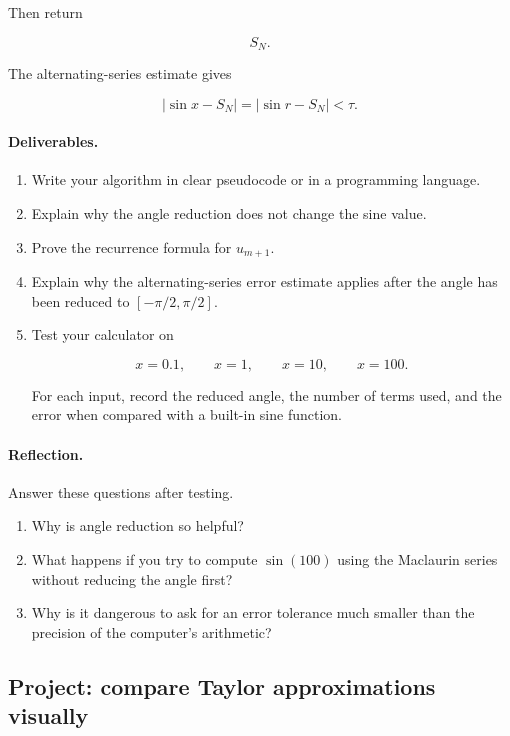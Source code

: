 Then return

\[
S_N.
\]

The alternating-series estimate gives

\[
|\sin x-S_N|=|\sin r-S_N|<\tau.
\]

\paragraph{Deliverables.}
\begin{enumerate}
\item Write your algorithm in clear pseudocode or in a programming language.

\item Explain why the angle reduction does not change the sine value.

\item Prove the recurrence formula for \(u_{m+1}\).

\item Explain why the alternating-series error estimate applies after the angle has been
reduced to \([-\pi/2,\pi/2]\).

\item Test your calculator on

\[
x=0.1,\qquad x=1,\qquad x=10,\qquad x=100.
\]

For each input, record the reduced angle, the number of terms used, and the error when
compared with a built-in sine function.
\end{enumerate}

\paragraph{Reflection.}
Answer these questions after testing.

\begin{enumerate}
\item Why is angle reduction so helpful?

\item What happens if you try to compute \(\sin(100)\) using the Maclaurin series without
reducing the angle first?

\item Why is it dangerous to ask for an error tolerance much smaller than the precision of
the computer's arithmetic?
\end{enumerate}

\subsection{Project: compare Taylor approximations visually}
\label{subsec:project-compare-taylor-visually}

